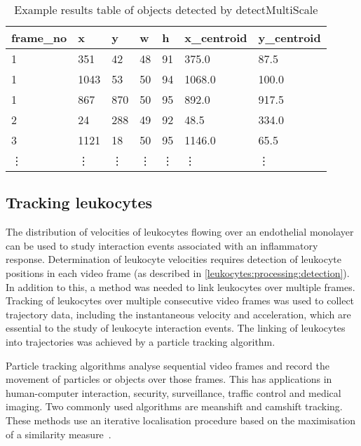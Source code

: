 \begin{table}[htbp]
\centering
\caption{Example results table of objects detected by detectMultiScale}
\begin{tabular}{lllllll}
\toprule
frame\_no & x      & y      & w      & h      & x\_centroid & y\_centroid \\
\midrule
1         & 351    & 42     & 48     & 91     & 375.0       & 87.5        \\
1         & 1043   & 53     & 50     & 94     & 1068.0      & 100.0       \\
1         & 867    & 870    & 50     & 95     & 892.0       & 917.5       \\
2         & 24     & 288    & 49     & 92     & 48.5        & 334.0       \\
3         & 1121   & 18     & 50     & 95     & 1146.0      & 65.5        \\
\vdots    & \vdots & \vdots & \vdots & \vdots & \vdots      & \vdots      \\
\bottomrule
\end{tabular}
\label{table:particles_features}
\end{table}

\subsection{Tracking leukocytes}
\label{leukocytes:processing:tracking}
The distribution of velocities of leukocytes flowing over an endothelial monolayer can be used to study interaction events associated with an inflammatory response. Determination of leukocyte velocities requires detection of leukocyte positions in each video frame (as described in \autoref{leukocytes:processing:detection}). In addition to this, a method was needed to link leukocytes over multiple frames. Tracking of leukocytes over multiple consecutive video frames was used to collect trajectory data, including the instantaneous velocity and acceleration, which are essential to the study of leukocyte interaction events. The linking of leukocytes into trajectories was achieved by a particle tracking algorithm.

Particle tracking algorithms analyse sequential video frames and record the movement of particles or objects over those frames. This has applications in human-computer interaction, security, surveillance, traffic control and medical imaging. Two commonly used algorithms are meanshift and camshift tracking. These methods use an iterative localisation procedure based on the maximisation of a similarity measure~\cite{Comaniciu2000}.

